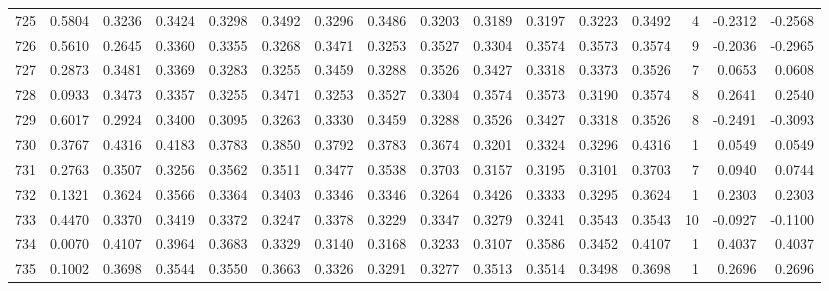 \begin{tabular}{lrrrrrrrrrrrrrrr}
725 &      0.5804 &  0.3236 &  0.3424 &  0.3298 &  0.3492 &  0.3296 &  0.3486 &  0.3203 &  0.3189 &  0.3197 &   0.3223 &     0.3492 &      4 &                   -0.2312 &                    -0.2568 \\
726 &      0.5610 &  0.2645 &  0.3360 &  0.3355 &  0.3268 &  0.3471 &  0.3253 &  0.3527 &  0.3304 &  0.3574 &   0.3573 &     0.3574 &      9 &                   -0.2036 &                    -0.2965 \\
727 &      0.2873 &  0.3481 &  0.3369 &  0.3283 &  0.3255 &  0.3459 &  0.3288 &  0.3526 &  0.3427 &  0.3318 &   0.3373 &     0.3526 &      7 &                    0.0653 &                     0.0608 \\
728 &      0.0933 &  0.3473 &  0.3357 &  0.3255 &  0.3471 &  0.3253 &  0.3527 &  0.3304 &  0.3574 &  0.3573 &   0.3190 &     0.3574 &      8 &                    0.2641 &                     0.2540 \\
729 &      0.6017 &  0.2924 &  0.3400 &  0.3095 &  0.3263 &  0.3330 &  0.3459 &  0.3288 &  0.3526 &  0.3427 &   0.3318 &     0.3526 &      8 &                   -0.2491 &                    -0.3093 \\
730 &      0.3767 &  0.4316 &  0.4183 &  0.3783 &  0.3850 &  0.3792 &  0.3783 &  0.3674 &  0.3201 &  0.3324 &   0.3296 &     0.4316 &      1 &                    0.0549 &                     0.0549 \\
731 &      0.2763 &  0.3507 &  0.3256 &  0.3562 &  0.3511 &  0.3477 &  0.3538 &  0.3703 &  0.3157 &  0.3195 &   0.3101 &     0.3703 &      7 &                    0.0940 &                     0.0744 \\
732 &      0.1321 &  0.3624 &  0.3566 &  0.3364 &  0.3403 &  0.3346 &  0.3346 &  0.3264 &  0.3426 &  0.3333 &   0.3295 &     0.3624 &      1 &                    0.2303 &                     0.2303 \\
733 &      0.4470 &  0.3370 &  0.3419 &  0.3372 &  0.3247 &  0.3378 &  0.3229 &  0.3347 &  0.3279 &  0.3241 &   0.3543 &     0.3543 &     10 &                   -0.0927 &                    -0.1100 \\
734 &      0.0070 &  0.4107 &  0.3964 &  0.3683 &  0.3329 &  0.3140 &  0.3168 &  0.3233 &  0.3107 &  0.3586 &   0.3452 &     0.4107 &      1 &                    0.4037 &                     0.4037 \\
735 &      0.1002 &  0.3698 &  0.3544 &  0.3550 &  0.3663 &  0.3326 &  0.3291 &  0.3277 &  0.3513 &  0.3514 &   0.3498 &     0.3698 &      1 &                    0.2696 &                     0.2696 \\

\end{tabular}
